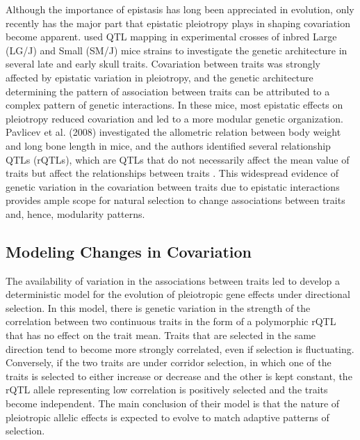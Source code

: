\begin{refsection}
Although the importance of epistasis has long been appreciated in
evolution, only recently has the major part that epistatic pleiotropy
plays in shaping covariation become apparent.
\textcite{Wolf2005-nr} used QTL mapping
in experimental crosses of inbred Large (LG/J) and Small (SM/J) mice
strains to investigate the genetic architecture in several late and
early skull traits. Covariation between traits was strongly affected by
epistatic variation in pleiotropy, and the genetic architecture
determining the pattern of association between traits can be attributed
to a complex pattern of genetic interactions. In these mice, most
epistatic effects on pleiotropy reduced covariation and led to a more
modular genetic organization. Pavlicev et al. (2008) investigated the allometric relation between body weight and long bone length in mice, and the authors identified several
relationship QTLs (rQTLs), which are QTLs that do not necessarily affect
the mean value of traits but affect the relationships between traits
\parencite{Wagner2007-cx}. This widespread
evidence of genetic variation in the covariation between traits due to
epistatic interactions provides ample scope for natural selection to
change associations between traits and, hence, modularity patterns.

\subsection{Modeling Changes in Covariation}

The availability of variation in the associations between traits led
\textcite{Pavlicev2011-wz} to develop a
deterministic model for the evolution of pleiotropic gene effects under
directional selection. In this model, there is genetic variation in the
strength of the correlation between two continuous traits in the form of
a polymorphic rQTL that has no effect on the trait mean. Traits that are
selected in the same direction tend to become more strongly correlated,
even if selection is fluctuating. Conversely, if the two traits are
under corridor selection, in which one of the traits is selected to
either increase or decrease and the other is kept constant, the rQTL
allele representing low correlation is positively selected and the
traits become independent. The main conclusion of their model is that
the nature of pleiotropic allelic effects is expected to evolve to match
adaptive patterns of selection.


\end{refsection}
